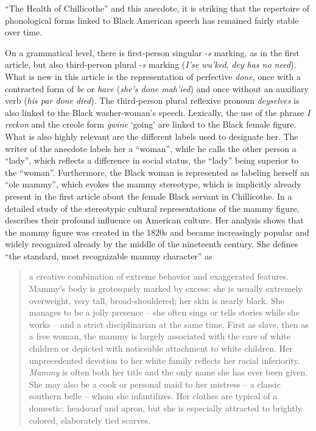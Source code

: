 “The Health of Chillicothe” and this anecdote, it is striking that the repertoire of phonological forms linked to Black American speech has remained fairly stable over time.

On a grammatical level, there is first-person singular -\emph{s} marking, as in the first article, but also third-person plural -\emph{s} marking (\emph{I’se wu’ked}, \emph{dey has no need}). What is new in this article is the representation of perfective \emph{done}, once with a contracted form of \emph{be} or \emph{have} (\emph{she’s done mah’ied}) and once without an auxiliary verb (\emph{his par done died}). The third-person plural reflexive pronoun \emph{deyselves} is also linked to the Black washer-woman’s speech. Lexically, the use of the phrase \emph{I reckon} and the creole form \emph{gwine} ‘going’ are linked to the Black female figure. What is also highly relevant are the different labels used to designate her. The writer of the anecdote labels her a “woman”, while he calls the other person a “lady”, which reflects a difference in social status, the “lady” being superior to the “woman”. Furthermore, the Black woman is represented as labeling herself an “ole mammy”, which evokes the mammy stereotype, which is implicitly already present in the first article about the female Black servant in Chillicothe. In a detailed study of the stereotypic cultural representations of the mammy figure, \citet{WallaceSanders2008} describes their profound influence on American culture. Her analysis shows that the mammy figure was created in the 1820s and became increasingly popular and widely recognized already by the middle of the nineteenth century. She defines “the standard, most recognizable mammy character” as

\begin{quote}
a creative combination of extreme behavior and exaggerated features. Mam\-my's body is grotesquely marked by excess: she is usually extremely overweight, very tall, broad-shouldered; her skin is nearly black. She manages to be a jolly presence – she often sings or tells stories while she works – and a strict disciplinarian at the same time. First as slave, then as a free woman, the mammy is largely associated with the care of white children or depicted with noticeable attachment to white children. Her unprecedented devotion to her white family reflects her racial inferiority. \textit{Mammy} is often both her title and the only name she has ever been given. She may also be a cook or personal maid to her mistress – a classic southern belle – whom she infantilizes. Her clothes are typical of a domestic: headscarf and apron, but she is especially attracted to brightly colored, elaborately tied scarves. \citep[5--6]{WallaceSanders2008}
\end{quote}



